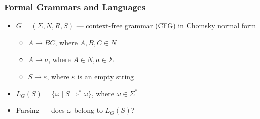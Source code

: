 \documentclass[xcolor=table]{beamer}
\begin{document}
\begin{frame}[fragile] \frametitle{Formal Grammars and Languages}
        \begin{itemize}
        \item $G = (\Sigma, N, R, S)$ --- context-free grammar (CFG) in Chomsky normal form
          \begin{itemize}
            \item $A \rightarrow B C$, where $A, B, C \in N$
            \item $A \rightarrow a$, where $A \in N, a \in \Sigma$
            \item $S \rightarrow \varepsilon$, where $\varepsilon$ is an empty string
          \end{itemize}
        \item $L_G (S) = \{ \omega \mid S \Rightarrow^* \omega \}$, where $\omega \in \Sigma^*$
        \item Parsing --- does $\omega$ belong to $ L_G (S)$?

        \end{itemize}
\end{frame}
\end{document}
